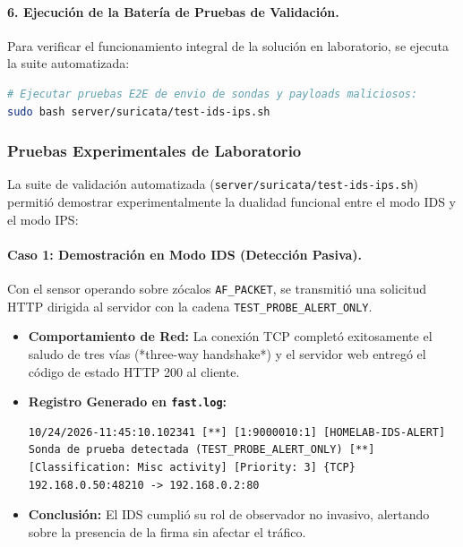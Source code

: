\paragraph{6. Ejecución de la Batería de Pruebas de Validación.}
Para verificar el funcionamiento integral de la solución en laboratorio, se ejecuta la suite automatizada:
\begin{lstlisting}[language=bash]
# Ejecutar pruebas E2E de envio de sondas y payloads maliciosos:
sudo bash server/suricata/test-ids-ips.sh
\end{lstlisting}

\subsubsection{Pruebas Experimentales de Laboratorio}

La suite de validación automatizada (\texttt{server/suricata/test-ids-ips.sh}) permitió demostrar experimentalmente la dualidad funcional entre el modo IDS y el modo IPS:

\paragraph{Caso 1: Demostración en Modo IDS (Detección Pasiva).}
Con el sensor operando sobre zócalos \texttt{AF\_PACKET}, se transmitió una solicitud HTTP dirigida al servidor con la cadena \texttt{TEST\_PROBE\_ALERT\_ONLY}.
\begin{itemize}
  \item \textbf{Comportamiento de Red:} La conexión TCP completó exitosamente el saludo de tres vías (*three-way handshake*) y el servidor web entregó el código de estado HTTP 200 al cliente.
  \item \textbf{Registro Generado en \texttt{fast.log}:}
\begin{lstlisting}[style=terminal]
10/24/2026-11:45:10.102341 [**] [1:9000010:1] [HOMELAB-IDS-ALERT] Sonda de prueba detectada (TEST_PROBE_ALERT_ONLY) [**] [Classification: Misc activity] [Priority: 3] {TCP} 192.168.0.50:48210 -> 192.168.0.2:80
\end{lstlisting}
  \item \textbf{Conclusión:} El IDS cumplió su rol de observador no invasivo, alertando sobre la presencia de la firma sin afectar el tráfico.
\end{itemize}

